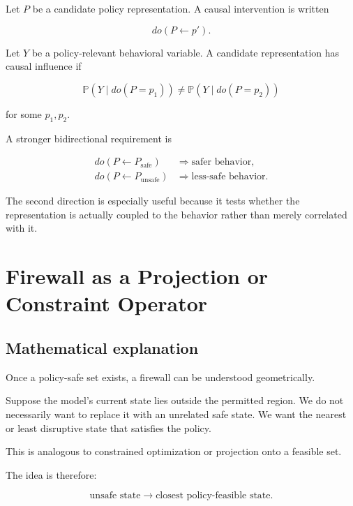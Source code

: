 \documentclass[11pt]{article}
\newcommand{\Prob}{\mathbb{P}}
\begin{document}
Let $P$ be a candidate policy representation. A causal intervention is written

\begin{equation}
do(P\leftarrow p').
\end{equation}

Let $Y$ be a policy-relevant behavioral variable. A candidate representation
has causal influence if

\begin{equation}
\Prob(Y\mid do(P=p_1))
\neq
\Prob(Y\mid do(P=p_2))
\end{equation}

for some $p_1,p_2$.

A stronger bidirectional requirement is

\begin{align}
do(P\leftarrow P_{\mathrm{safe}})
&\Rightarrow
\text{safer behavior},\\
do(P\leftarrow P_{\mathrm{unsafe}})
&\Rightarrow
\text{less-safe behavior}.
\end{align}

The second direction is especially useful because it tests whether the
representation is actually coupled to the behavior rather than merely
correlated with it.

\section{Firewall as a Projection or Constraint Operator}

\subsection*{Mathematical explanation}

Once a policy-safe set exists, a firewall can be understood geometrically.

Suppose the model's current state lies outside the permitted region. We do
not necessarily want to replace it with an unrelated safe state. We want the
nearest or least disruptive state that satisfies the policy.

This is analogous to constrained optimization or projection onto a feasible
set.

The idea is therefore:

\begin{equation}
\text{unsafe state}
\longrightarrow
\text{closest policy-feasible state}.
\end{equation}
\end{document}
